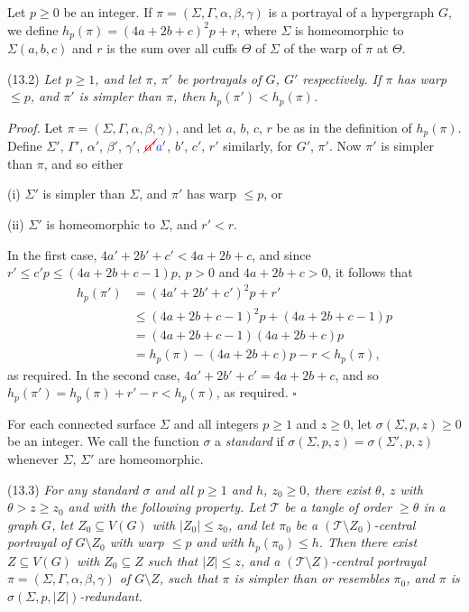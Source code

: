 Let $p \ge 0$ be an integer. If $\pi = (\Sigma, \Gamma, \alpha, \beta, \gamma)$ is a portrayal of a hypergraph $G$, we define $h_p(\pi) = (4a + 2b + c)^2 p + r$, where $\Sigma$ is homeomorphic to $\Sigma(a, b, c)$ and $r$ is the sum over all cuffs $\Theta$ of $\Sigma$ of the warp of $\pi$ at $\Theta$.

\stmt
(13.2) \textit{Let $p \ge 1$, and let $\pi$, $\pi'$ be portrayals of $G$, $G'$ respectively. If $\pi$ has warp $\le p$, and $\pi'$ is simpler than $\pi$, then $h_p(\pi') < h_p(\pi)$.}

\textit{Proof.} Let $\pi = (\Sigma, \Gamma, \alpha, \beta, \gamma)$, and let $a$, $b$, $c$, $r$ be as in the definition of $h_p(\pi)$. Define $\Sigma'$, $\Gamma'$, $\alpha'$, $\beta'$, $\gamma'$, $\delm{\alpha'}\fix{a'}$, $b'$, $c'$, $r'$ similarly, for $G'$, $\pi'$. Now $\pi'$ is simpler than $\pi$, and so either

\hspace*{12pt}(i) $\Sigma'$ is simpler than $\Sigma$, and $\pi'$ has warp $\le p$, or

\hspace*{12pt}(ii) $\Sigma'$ is homeomorphic to $\Sigma$, and $r' < r$.

In the first case, $4a' + 2b' + c' < 4a + 2b + c$, and since $r' \le c'p \le (4a + 2b + c - 1)p$, $p > 0$ and $4a + 2b + c > 0$, it follows that
\begin{align*}
h_p(\pi') &= (4a' + 2b' + c')^2 p + r' \\
&\le (4a + 2b + c - 1)^2 p + (4a + 2b + c - 1)p \\
&= (4a + 2b + c - 1)(4a + 2b + c)p \\
&= h_p(\pi) - (4a + 2b + c)p - r < h_p(\pi),
\end{align*}
as required. In the second case, $4a' + 2b' + c' = 4a + 2b + c$, and so $h_p(\pi') = h_p(\pi) + r' - r < h_p(\pi)$, as required. $\square$

For each connected surface $\Sigma$ and all integers $p \ge 1$ and $z \ge 0$, let $\sigma(\Sigma, p, z) \ge 0$ be an integer. We call the function $\sigma$ a \textit{standard} if $\sigma(\Sigma, p, z) = \sigma(\Sigma', p, z)$ whenever $\Sigma$, $\Sigma'$ are homeomorphic.

\stmt
(13.3) \textit{For any standard $\sigma$ and all $p \ge 1$ and $h$, $z_0 \ge 0$, there exist $\theta$, $z$ with $\theta > z \ge z_0$ and with the following property. Let $\mathcal{T}$ be a tangle of order $\ge \theta$ in a graph $G$, let $Z_0 \subseteq V(G)$ with $|Z_0| \le z_0$, and let $\pi_0$ be a $(\mathcal{T} \setminus Z_0)$-central portrayal of $G \setminus Z_0$ with warp $\le p$ and with $h_p(\pi_0) \le h$. Then there exist $Z \subseteq V(G)$ with $Z_0 \subseteq Z$ such that $|Z| \le z$, and a $(\mathcal{T} \setminus Z)$-central portrayal $\pi = (\Sigma, \Gamma, \alpha, \beta, \gamma)$ of $G \setminus Z$, such that $\pi$ is simpler than or resembles $\pi_0$, and $\pi$ is $\sigma(\Sigma, p, |Z|)$-redundant.}

